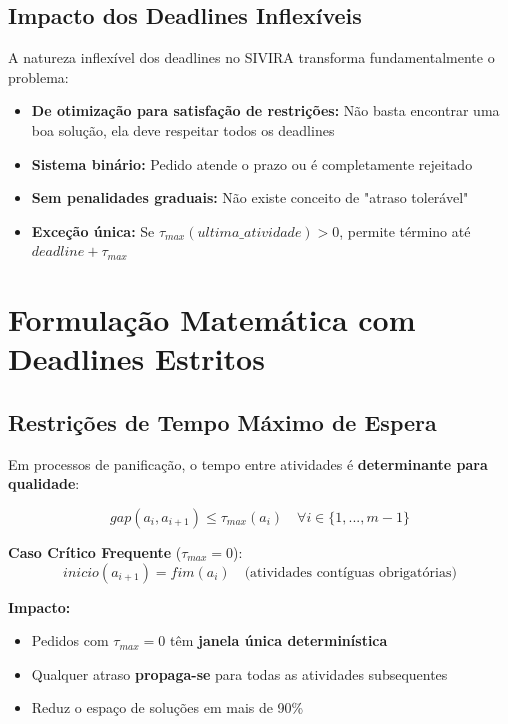 \documentclass[11pt,a4paper]{article}
\begin{document}
\subsection{Impacto dos Deadlines Inflexíveis}

A natureza inflexível dos deadlines no SIVIRA transforma fundamentalmente o problema:

\begin{itemize}
    \item \textbf{De otimização para satisfação de restrições:} Não basta encontrar uma boa solução, ela deve respeitar todos os deadlines
    \item \textbf{Sistema binário:} Pedido atende o prazo ou é completamente rejeitado
    \item \textbf{Sem penalidades graduais:} Não existe conceito de "atraso tolerável"
    \item \textbf{Exceção única:} Se $\tau_{max}(ultima\_atividade) > 0$, permite término até $deadline + \tau_{max}$
\end{itemize}

\section{Formulação Matemática com Deadlines Estritos}

\subsection{Restrições de Tempo Máximo de Espera}

Em processos de panificação, o tempo entre atividades é \textbf{determinante para qualidade}:

\begin{equation}
gap(a_i, a_{i+1}) \leq \tau_{max}(a_i) \quad \forall i \in \{1, ..., m-1\}
\end{equation}

\textbf{Caso Crítico Frequente} ($\tau_{max} = 0$):
\begin{equation}
inicio(a_{i+1}) = fim(a_i) \quad \text{(atividades contíguas obrigatórias)}
\end{equation}

\textbf{Impacto:}
\begin{itemize}
    \item Pedidos com $\tau_{max} = 0$ têm \textbf{janela única determinística}
    \item Qualquer atraso \textbf{propaga-se} para todas as atividades subsequentes
    \item Reduz o espaço de soluções em mais de 90\%
\end{itemize}
\end{document}
